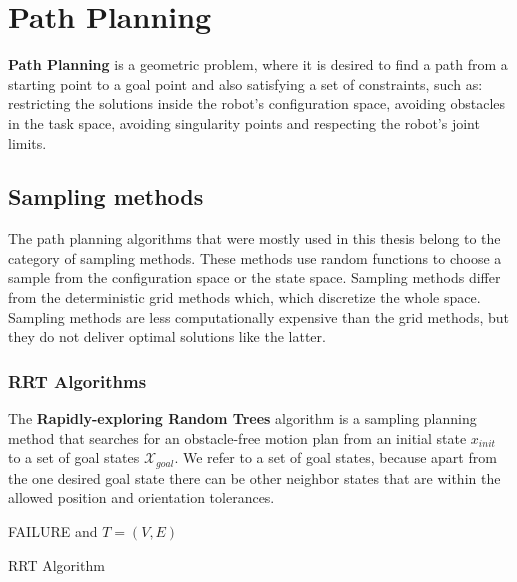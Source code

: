 \section{Path Planning}

\textbf{Path Planning} is a geometric problem, where it is desired to find a path from a starting point to a goal point and also satisfying a set of constraints, such as: 
restricting the solutions inside the robot's configuration space, avoiding obstacles in the task space, avoiding singularity points and respecting the robot's 
joint limits.


\subsection{Sampling methods}

The path planning algorithms that were mostly used in this thesis belong to the category of sampling methods. These methods use random functions to choose a sample from 
the configuration space or the state space. Sampling methods differ from the deterministic grid methods which, which discretize the whole space. Sampling methods are less 
computationally expensive than the grid methods, but they do not deliver optimal solutions like the latter.


\subsubsection{RRT Algorithms}

The \textbf{Rapidly-exploring Random Trees} algorithm is a sampling planning method that searches for an obstacle-free motion plan from an initial state $x_{init}$ to a set of goal states $\mathcal{X}_{goal}$. We refer to a set 
of goal states, because apart from the one desired goal state there can be other neighbor states that are within the allowed position and orientation tolerances.

\begin{algorithm}[H]
\SetAlgoLined
{}
\Return FAILURE and $ T=(V,E) $ \;
\caption{RRT Algorithm}
\end{algorithm}

